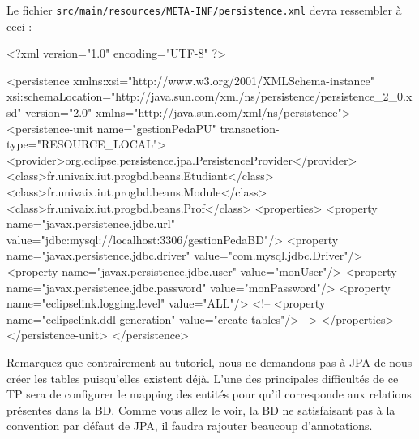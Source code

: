 \documentclass[a4paper,11pt]{article}
\begin{document}
Le fichier \texttt{src/main/resources/META-INF/persistence.xml} devra ressembler à ceci :
\begin{code_xml}
<?xml version="1.0" encoding="UTF-8" ?>

<persistence xmlns:xsi="http://www.w3.org/2001/XMLSchema-instance" 
  xsi:schemaLocation="http://java.sun.com/xml/ns/persistence/persistence_2_0.xsd" 
  version="2.0" xmlns="http://java.sun.com/xml/ns/persistence">
  <persistence-unit name="gestionPedaPU" transaction-type="RESOURCE_LOCAL">
    <provider>org.eclipse.persistence.jpa.PersistenceProvider</provider>
	<class>fr.univaix.iut.progbd.beans.Etudiant</class>
	<class>fr.univaix.iut.progbd.beans.Module</class>
	<class>fr.univaix.iut.progbd.beans.Prof</class>
    <properties>
      <property name="javax.persistence.jdbc.url" value="jdbc:mysql://localhost:3306/gestionPedaBD"/>
      <property name="javax.persistence.jdbc.driver" value="com.mysql.jdbc.Driver"/>
      <property name="javax.persistence.jdbc.user"  value="monUser"/>
      <property name="javax.persistence.jdbc.password"  value="monPassword"/>
      <property name="eclipselink.logging.level" value="ALL"/>
<!--  <property name="eclipselink.ddl-generation"  value="create-tables"/> -->
    </properties>
  </persistence-unit>
</persistence>
\end{code_xml}
Remarquez que contrairement au tutoriel, nous ne demandons pas à JPA de nous créer les tables puisqu'elles existent déjà.
L'une des principales difficultés de ce TP sera de configurer le mapping des entités pour qu'il corresponde aux relations 
présentes dans la BD. Comme vous allez le voir, la BD ne satisfaisant pas à la convention par défaut de JPA,
il faudra rajouter beaucoup d'annotations.
\end{document}
